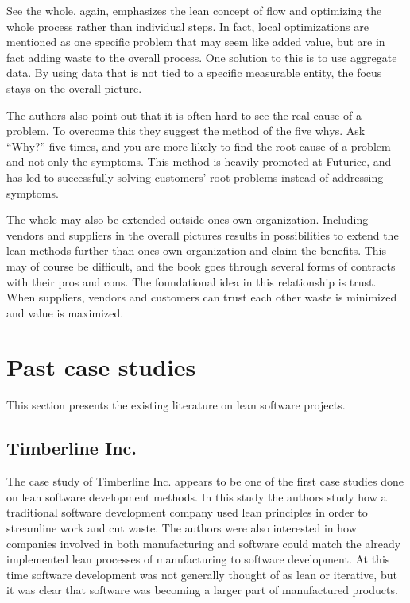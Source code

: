 See the whole, again, emphasizes the lean concept of flow and optimizing the whole process rather than individual steps. In fact, local optimizations are mentioned as one specific problem that may seem like added value, but are in fact adding waste to the overall process. One solution to this is to use aggregate data. By using data that is not tied to a specific measurable entity, the focus stays on the overall picture.\cite{poppendieck2003lean}

The authors also point out that it is often hard to see the real cause of a problem. To overcome this they suggest the method of the five whys. Ask ``Why?'' five times, and you are more likely to find the root cause of a problem and not only the symptoms.\cite{poppendieck2003lean} This method is heavily promoted at Futurice, and has led to successfully solving customers' root problems instead of addressing symptoms.

The whole may also be extended outside ones own organization. Including vendors and suppliers in the overall pictures results in possibilities to extend the lean methods further than ones own organization and claim the benefits. This may of course be difficult, and the book goes through several forms of contracts with their pros and cons. The foundational idea in this relationship is trust. When suppliers, vendors and customers can trust each other waste is minimized and value is maximized.\cite{poppendieck2003lean}


\section{Past case studies}
\label{section:casestudies}

This section presents the existing literature on lean software projects.\\


\subsection{Timberline Inc.}
\label{timberline}

The case study of Timberline Inc. appears to be one of the first case studies done on lean software development methods. In this study the authors study how a traditional software development company used lean principles in order to streamline work and cut waste. The authors were also interested in how companies involved in both manufacturing and software could match the already implemented lean processes of manufacturing to software development. At this time software development was not generally thought of as lean or iterative, but it was clear that software was becoming a larger part of manufactured products.\cite{Middleton2005Lean}

